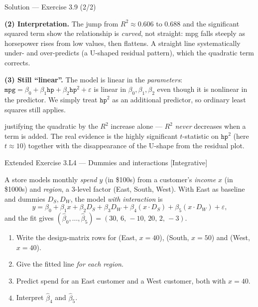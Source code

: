 \documentclass[aspectratio=169,11pt]{beamer}
\begin{document}
\begin{frame}{Solution --- Exercise 3.9 (2/2)}
  \begin{solutionbox}
    \textbf{(2) Interpretation.} The jump from $R^2\approx 0.606$ to
    $0.688$ and the significant squared term show the relationship is
    \emph{curved}, not straight: mpg falls steeply as horsepower rises
    from low values, then flattens. A straight line systematically
    under- and over-predicts (a U-shaped residual pattern), which the
    quadratic term corrects.

    \textbf{(3) Still ``linear''.} The model is linear in the
    \emph{parameters}: $\texttt{mpg}=\beta_0+\beta_1\texttt{hp}
    +\beta_2\texttt{hp}^2+\varepsilon$ is linear in
    $\beta_0,\beta_1,\beta_2$ even though it is nonlinear in the
    predictor. We simply treat $\texttt{hp}^2$ as an additional
    predictor, so ordinary least squares still applies.
  \end{solutionbox}
  \begin{mistake}
    justifying the quadratic by the $R^2$
    increase alone --- $R^2$ \emph{never} decreases when a term is
    added. The real evidence is the highly significant $t$-statistic
    on $\texttt{hp}^2$ (here $t\approx 10$) together with the
    disappearance of the U-shape from the residual plot.
  \end{mistake}
\end{frame}

\begin{frame}{Extended Exercise 3.L4 --- Dummies and interactions [Integrative]}
  \begin{longexercise}
    A store models monthly \emph{spend} $y$ (in \$100s) from a customer's
    \emph{income} $x$ (in \$1000s) and \emph{region}, a 3-level factor
    (East, South, West). With East as baseline and dummies $D_S,D_W$, the
    model \emph{with interaction} is
    \[
      y=\beta_0+\beta_1 x+\beta_2 D_S+\beta_3 D_W
        +\beta_4 (x\!\cdot\!D_S)+\beta_5 (x\!\cdot\!D_W)+\varepsilon,
    \]
    and the fit gives $(\hat\beta_0,\dots,\hat\beta_5)=(30,\,6,\,-10,\,20,\,2,\,-3)$.
    \begin{enumerate}
      \item Write the design-matrix rows for (East, $x{=}40$),
            (South, $x{=}50$) and (West, $x{=}40$).
      \item Give the fitted line \emph{for each region}.
      \item Predict spend for an East customer and a West customer, both
            with $x{=}40$.
      \item Interpret $\hat\beta_4$ and $\hat\beta_5$.
    \end{enumerate}
  \end{longexercise}
\end{frame}
\end{document}
